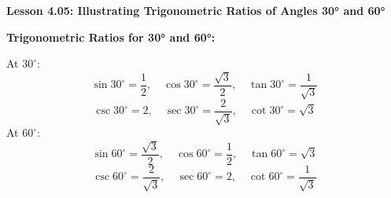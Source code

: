 \begin{center}
\textbf{Lesson 4.05: Illustrating Trigonometric Ratios of Angles 30° and 60°}
\end{center}

\vspace*{-1.5ex}

\noindent \textbf{Trigonometric Ratios for 30° and 60°:}
 
 \noindent  At \( 30^\circ \):
        \[
        \sin 30^\circ = \dfrac{1}{2}, \quad \cos 30^\circ = \dfrac{\sqrt{3}}{2}, \quad \tan 30^\circ = \dfrac{1}{\sqrt{3}}
        \]
        \[
        \csc 30^\circ = 2, \quad \sec 30^\circ = \dfrac{2}{\sqrt{3}}, \quad \cot 30^\circ = \sqrt{3}
        \]
\noindent  At \( 60^\circ \):
        \[
        \sin 60^\circ = \dfrac{\sqrt{3}}{2}, \quad \cos 60^\circ = \dfrac{1}{2}, \quad \tan 60^\circ = \sqrt{3}
        \]
        \[
        \csc 60^\circ = \dfrac{2}{\sqrt{3}}, \quad \sec 60^\circ = 2, \quad \cot 60^\circ = \dfrac{1}{\sqrt{3}}
        \]

        
